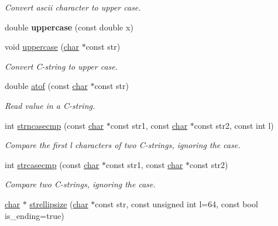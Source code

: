 \begin{DoxyCompactItemize}
\begin{DoxyCompactList}\small\item\em Convert ascii character to upper case. \end{DoxyCompactList}\item 
\mbox{\label{namespacecimg__library__suffixed_1_1cimg_a61266ea59c6fb0b76bba21326718ab41}} 
double {\bfseries uppercase} (const double x)
\item 
\mbox{\label{namespacecimg__library__suffixed_1_1cimg_ac13217912b5cdf549f5744910521881a}} 
void \hyperlink{namespacecimg__library__suffixed_1_1cimg_ac13217912b5cdf549f5744910521881a}{uppercase} (\hyperlink{classchar}{char} $\ast$const str)
\begin{DoxyCompactList}\small\item\em Convert C-\/string to upper case. \end{DoxyCompactList}\item 
double \hyperlink{namespacecimg__library__suffixed_1_1cimg_a00aba235049bc02e53453cbb829469ce}{atof} (const \hyperlink{classchar}{char} $\ast$const str)
\begin{DoxyCompactList}\small\item\em Read value in a C-\/string. \end{DoxyCompactList}\item 
int \hyperlink{namespacecimg__library__suffixed_1_1cimg_a1304046a29511fe0a015173e46607229}{strncasecmp} (const \hyperlink{classchar}{char} $\ast$const str1, const \hyperlink{classchar}{char} $\ast$const str2, const int l)
\begin{DoxyCompactList}\small\item\em Compare the first {\ttfamily l} characters of two C-\/strings, ignoring the case. \end{DoxyCompactList}\item 
int \hyperlink{namespacecimg__library__suffixed_1_1cimg_a1c34609cc6fef6f5fe5ffb2f69ad7989}{strcasecmp} (const \hyperlink{classchar}{char} $\ast$const str1, const \hyperlink{classchar}{char} $\ast$const str2)
\begin{DoxyCompactList}\small\item\em Compare two C-\/strings, ignoring the case. \end{DoxyCompactList}\item 
\hyperlink{classchar}{char} $\ast$ \hyperlink{namespacecimg__library__suffixed_1_1cimg_a69a3a1bbdf0f62474211ea5a398f9e72}{strellipsize} (\hyperlink{classchar}{char} $\ast$const str, const unsigned int l=64, const bool is\+\_\+ending=true)

\end{DoxyCompactItemize}
